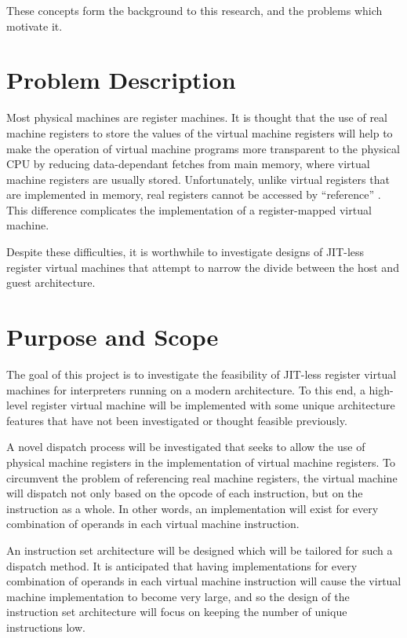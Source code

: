 			These concepts form the background to this research, and the problems which motivate it.
	
	\section{Problem Description}
		Most physical machines are register machines. It is thought that the use of real machine registers to store the values of the virtual machine registers will help to make the operation of virtual machine programs more transparent to the physical CPU by reducing data-dependant fetches from main memory, where virtual machine registers are usually stored. Unfortunately, unlike virtual registers that are implemented in memory, real registers cannot be accessed by ``reference'' \citep{caseregistervm}. This difference complicates the implementation of a register-mapped virtual machine.
		
		Despite these difficulties, it is worthwhile to investigate designs of JIT-less register virtual machines that attempt to narrow the divide between the host and guest architecture.
	
		
	\section{Purpose and Scope}
		The goal of this project is to investigate the feasibility of JIT-less register virtual machines for interpreters running on a modern architecture. To this end, a high-level register virtual machine will be implemented with some unique architecture features that have not been investigated or thought feasible previously.
		
		A novel dispatch process will be investigated that seeks to allow the use of physical machine registers in the implementation of virtual machine registers. To circumvent the problem of referencing real machine registers, the virtual machine will dispatch not only based on the opcode of each instruction, but on the instruction as a whole. In other words, an implementation will exist for every combination of operands in each virtual machine instruction.
	
		An instruction set architecture will be designed which will be tailored for such a dispatch method. It is anticipated that having implementations for every combination of operands in each virtual machine instruction will cause the virtual machine implementation to become very large, and so the design of the instruction set architecture will focus on keeping the number of unique instructions low.
		
